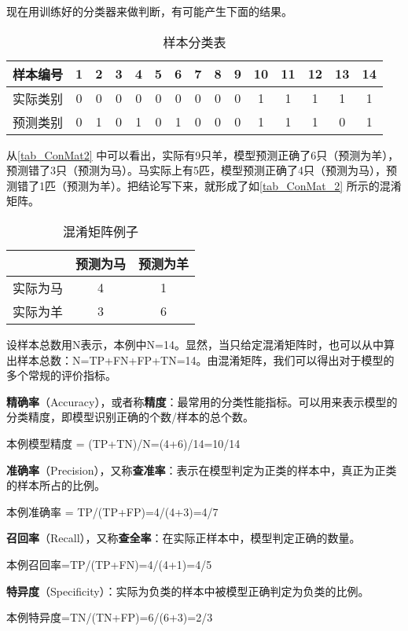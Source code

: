 现在用训练好的分类器来做判断，有可能产生下面的结果。

\begin{table}[ht]
\centering
\caption{样本分类表}\label{tab_ConMat2}
\begin{tabular}{|c|c|c|c|c|c|c|c|c|c|c|c|c|c|c|}
\hline
样本编号 & 1 & 2 & 3 & 4 & 5 & 6 & 7 & 8 & 9 & 10 & 11 & 12 & 13 & 14 \\
\hline
实际类别 & 0 & 0 & 0 & 0 & 0 & 0 & 0 & 0 & 0 & 1 & 1 & 1 & 1 & 1 \\
\hline
预测类别 & 0 & 1 & 0 & 1 & 0 & 1 & 0 & 0 & 0 & 1 & 1 & 1 & 0 & 1 \\
\hline
\end{tabular}
\end{table}

从\autoref{tab_ConMat2} 中可以看出，实际有9只羊，模型预测正确了6只（预测为羊），预测错了3只（预测为马）。马实际上有5匹，模型预测正确了4只（预测为马），预测错了1匹（预测为羊）。把结论写下来，就形成了如\autoref{tab_ConMat_2} 所示的混淆矩阵。
\begin{table}[ht]
\centering
\caption{混淆矩阵例子}\label{tab_ConMat_2}
\begin{tabular}{|c|c|c|}
\hline
 & 预测为马 & 预测为羊 \\
\hline
实际为马 & 4 & 1 \\
\hline
实际为羊 & 3 & 6 \\
\hline
\end{tabular}
\end{table}

设样本总数用N表示，本例中N=14。显然，当只给定混淆矩阵时，也可以从中算出样本总数：N=TP+FN+FP+TN=14。由混淆矩阵，我们可以得出对于模型的多个常规的评价指标。

\textbf{精确率}（Accuracy），或者称\textbf{精度}：最常用的分类性能指标。可以用来表示模型的分类精度，即模型识别正确的个数/样本的总个数。

本例模型精度 = (TP+TN)/N=(4+6)/14=10/14

\textbf{准确率}（Precision），又称\textbf{查准率}：表示在模型判定为正类的样本中，真正为正类的样本所占的比例。

本例准确率 = TP/(TP+FP)=4/(4+3)=4/7

\textbf{召回率}（Recall），又称\textbf{查全率}：在实际正样本中，模型判定正确的数量。

本例召回率=TP/(TP+FN)=4/(4+1)=4/5

\textbf{特异度}（Specificity）：实际为负类的样本中被模型正确判定为负类的比例。

本例特异度=TN/(TN+FP)=6/(6+3)=2/3

